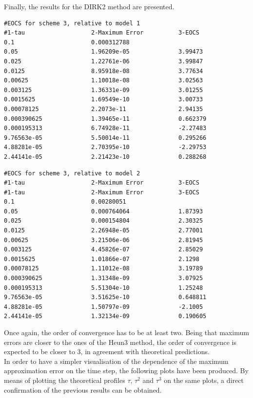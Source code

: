 \documentclass[11pt]{article}
\theoremstyle{theorem}
\theoremstyle{definition}
\begin{document}
Finally, the results for the DIRK2 method are presented.\\

\begin{lstlisting}
#EOCS for scheme 3, relative to model 1
#1-tau                   2-Maximum Error          3-EOCS                   
0.1                      0.000312788              	
0.05                     1.96209e-05              3.99473
0.025                    1.22761e-06              3.99847
0.0125                   8.95918e-08              3.77634
0.00625                  1.10018e-08              3.02563
0.003125                 1.36331e-09              3.01255
0.0015625                1.69549e-10              3.00733
0.00078125               2.2073e-11               2.94135
0.000390625              1.39465e-11              0.662379
0.000195313              6.74928e-11              -2.27483
9.76563e-05              5.50014e-11              0.295266
4.88281e-05              2.70395e-10              -2.29753
2.44141e-05              2.21423e-10              0.288268
\end{lstlisting}

\begin{lstlisting}
#EOCS for scheme 3, relative to model 2
#1-tau                   2-Maximum Error          3-EOCS                   
#1-tau                   2-Maximum Error          3-EOCS                   
0.1                      0.00280051               	
0.05                     0.000764064              1.87393
0.025                    0.000154804              2.30325
0.0125                   2.26948e-05              2.77001
0.00625                  3.21506e-06              2.81945
0.003125                 4.45826e-07              2.85029
0.0015625                1.01866e-07              2.1298
0.00078125               1.11012e-08              3.19789
0.000390625              1.31348e-09              3.07925
0.000195313              5.51304e-10              1.25248
9.76563e-05              3.51625e-10              0.648811
4.88281e-05              1.50797e-09              -2.1005
2.44141e-05              1.32134e-09              0.190605
\end{lstlisting}

Once again, the order of convergence has to be at least two. Being that maximum errors are closer to the ones of the Heun3 method, the order of convergence is expected to be closer to 3, in agreement with theoretical predictions.\\

In order to have a simpler visualisation of the dependence of the maximum approximation error on the time step, the following plots have been produced. By means of plotting the theoretical profiles $\tau$, $\tau^2$ and $\tau^3$ on the same plots, a direct confirmation of the previous results can be obtained.\\
\end{document}
